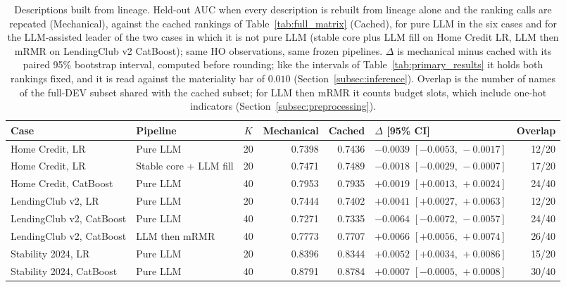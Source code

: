 \documentclass[final,5p,twocolumn]{elsarticle}
\newcommand{\Kfeat}{K}
\begin{document}
\begin{table}[htbp]
\centering
\footnotesize
\begin{threeparttable}
\caption{Descriptions built from lineage. Held-out AUC when every description is rebuilt from lineage alone and the ranking calls are repeated (Mechanical), against the cached rankings of Table~\ref{tab:full_matrix} (Cached), for pure LLM in the six cases and for the LLM-assisted leader of the two cases in which it is not pure LLM (stable core plus LLM fill on Home Credit LR, LLM then mRMR on LendingClub v2 CatBoost); same HO observations, same frozen pipelines. $\Delta$ is mechanical minus cached with its paired 95\% bootstrap interval, computed before rounding; like the intervals of Table~\ref{tab:primary_results} it holds both rankings fixed, and it is read against the materiality bar of $0.010$ (Section~\ref{subsec:inference}). Overlap is the number of names of the full-DEV subset shared with the cached subset; for LLM then mRMR it counts budget slots, which include one-hot indicators (Section~\ref{subsec:preprocessing}).}
\label{tab:mechanical}
\setlength{\tabcolsep}{5pt}
\begin{tabular}{@{}llcrrlr@{}}
\toprule
Case & Pipeline & $\Kfeat$ & Mechanical & Cached & $\Delta$ [95\% CI] & Overlap \\
\midrule
Home Credit, LR & Pure LLM & 20 & 0.7398 & 0.7436 & $-0.0039$ $[-0.0053,\,-0.0017]$ & 12/20 \\
Home Credit, LR & Stable core + LLM fill & 20 & 0.7471 & 0.7489 & $-0.0018$ $[-0.0029,\,-0.0007]$ & 17/20 \\
Home Credit, CatBoost & Pure LLM & 40 & 0.7953 & 0.7935 & $+0.0019$ $[+0.0013,\,+0.0024]$ & 24/40 \\
LendingClub v2, LR & Pure LLM & 20 & 0.7444 & 0.7402 & $+0.0041$ $[+0.0027,\,+0.0063]$ & 12/20 \\
LendingClub v2, CatBoost & Pure LLM & 40 & 0.7271 & 0.7335 & $-0.0064$ $[-0.0072,\,-0.0057]$ & 24/40 \\
LendingClub v2, CatBoost & LLM then mRMR & 40 & 0.7773 & 0.7707 & $+0.0066$ $[+0.0056,\,+0.0074]$ & 26/40 \\
Stability 2024, LR & Pure LLM & 20 & 0.8396 & 0.8344 & $+0.0052$ $[+0.0034,\,+0.0086]$ & 15/20 \\
Stability 2024, CatBoost & Pure LLM & 40 & 0.8791 & 0.8784 & $+0.0007$ $[-0.0005,\,+0.0008]$ & 30/40 \\
\bottomrule
\end{tabular}
\end{threeparttable}
\end{table}
\end{document}
